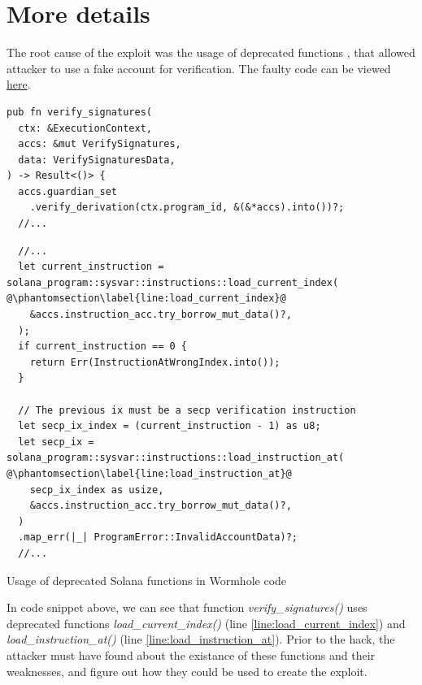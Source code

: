 \documentclass[fleqn,10pt]{olplainarticle}
\begin{document}
\section*{More details}
The root cause of the exploit was the usage of deprecated functions \cite{ackee, certik, immunebytes,linkedIn, rekt}, that allowed attacker to use a fake account for verification. The faulty code can be viewed \href{https://github.com/wormhole-foundation/wormhole/blob/ca509f2d73c0780e8516ffdfcaf90b38ab6db203/solana/bridge/program/src/api/verify_signature.rs#L68}{\color{red}here}.

\begin{listing}[H]

\begin{verbatim}
pub fn verify_signatures(
  ctx: &ExecutionContext,
  accs: &mut VerifySignatures,
  data: VerifySignaturesData,
) -> Result<()> {
  accs.guardian_set
    .verify_derivation(ctx.program_id, &(&*accs).into())?;
  //...
\end{verbatim}
\begin{verbatim}
  //...
  let current_instruction = solana_program::sysvar::instructions::load_current_index( @\phantomsection\label{line:load_current_index}@
    &accs.instruction_acc.try_borrow_mut_data()?,
  );
  if current_instruction == 0 {
    return Err(InstructionAtWrongIndex.into());
  }

  // The previous ix must be a secp verification instruction
  let secp_ix_index = (current_instruction - 1) as u8;
  let secp_ix = solana_program::sysvar::instructions::load_instruction_at( @\phantomsection\label{line:load_instruction_at}@
    secp_ix_index as usize,
    &accs.instruction_acc.try_borrow_mut_data()?,
  )
  .map_err(|_| ProgramError::InvalidAccountData)?;
  //...
\end{verbatim}
\caption{Usage of deprecated Solana functions in Wormhole code}
\label{list:code}

\end{listing}

In code snippet above, we can see that function \emph{verify\_signatures()} uses deprecated functions \emph{load\_current\_index()} (line \ref{line:load_current_index}) and \emph{load\_instruction\_at()} (line \ref{line:load_instruction_at}). Prior to the hack, the attacker must have found about the existance of these functions and their weaknesses, and figure out how they could be used to create the exploit.
\end{document}
